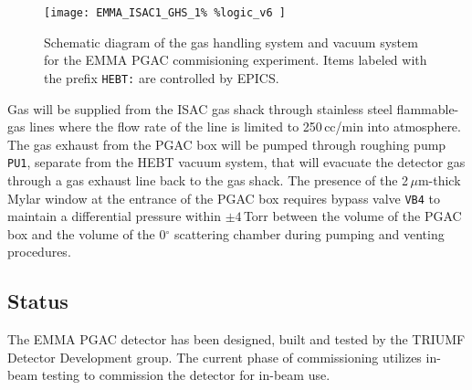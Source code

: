 
\begin{figure}[t]
\centerline{
\texttt{[image: EMMA\_ISAC1\_GHS\_1\%
\%logic\_v6
]}
}
\caption{Schematic diagram of the gas handling system and vacuum system for the EMMA PGAC commisioning experiment. Items labeled with the prefix \texttt{HEBT:} are controlled by EPICS.
}
\label{diagram}
\end{figure}

Gas will be supplied from the ISAC gas shack through stainless steel flammable-gas lines where the
flow rate of the line is limited to 250\,cc/min into atmosphere. The gas exhaust from the
PGAC box will be pumped through roughing pump \texttt{PU1}, separate from the HEBT vacuum system, that will evacuate the detector gas through a gas exhaust line back to the gas shack.
The presence of the 2\,$\mu$m-thick Mylar window at the entrance of the PGAC box requires bypass valve \texttt{VB4}
to maintain a differential pressure within $\pm 4$\,Torr between the volume of the PGAC box and the volume of  the 0$^\circ$ scattering chamber
during pumping and venting procedures.

\subsection{Status}
\label{det_status}
The EMMA PGAC detector has been designed, built and tested by the TRIUMF Detector Development group.  The current phase of commissioning utilizes in-beam testing to commission the detector for in-beam use. %
